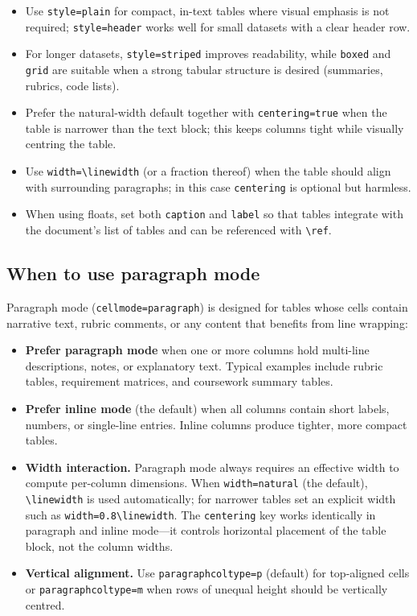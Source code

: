 \documentclass[11pt,a4paper]{article}
\begin{document}
\begin{itemize}
  \item Use \texttt{style=plain} for compact, in-text tables where visual
    emphasis is not required; \texttt{style=header} works well for small
    datasets with a clear header row.
  \item For longer datasets, \texttt{style=striped} improves readability,
    while \texttt{boxed} and \texttt{grid} are suitable when a strong
    tabular structure is desired (summaries, rubrics, code lists).
  \item Prefer the natural-width default together with
    \texttt{centering=true} when the table is narrower than the text
    block; this keeps columns tight while visually centring the table.
  \item Use \verb|width=\linewidth| (or a fraction thereof) when the
    table should align with surrounding paragraphs; in this case
    \texttt{centering} is optional but harmless.
  \item When using floats, set both \texttt{caption} and \texttt{label}
    so that tables integrate with the document’s list of tables and can
    be referenced with \verb|\ref|.
\end{itemize}

\subsection{When to use paragraph mode}

Paragraph mode (\texttt{cellmode=paragraph}) is designed for tables
whose cells contain narrative text, rubric comments, or any content
that benefits from line wrapping:

\begin{itemize}
  \item \textbf{Prefer paragraph mode} when one or more columns hold
    multi-line descriptions, notes, or explanatory text.  Typical
    examples include rubric tables, requirement matrices, and
    coursework summary tables.
  \item \textbf{Prefer inline mode} (the default) when all columns
    contain short labels, numbers, or single-line entries.  Inline
    columns produce tighter, more compact tables.
  \item \textbf{Width interaction.}  Paragraph mode always requires an
    effective width to compute per-column dimensions.  When
    \texttt{width=natural} (the default), \verb|\linewidth| is used
    automatically; for narrower tables set an explicit width such as
    \verb|width=0.8\linewidth|.  The \texttt{centering} key works
    identically in paragraph and inline mode---it controls horizontal
    placement of the table block, not the column widths.
  \item \textbf{Vertical alignment.}  Use \texttt{paragraphcoltype=p}
    (default) for top-aligned cells or \texttt{paragraphcoltype=m}
    when rows of unequal height should be vertically centred.
\end{itemize}
\end{document}

